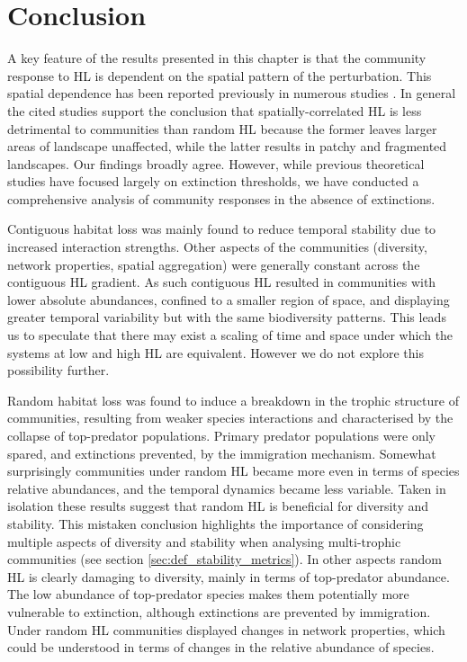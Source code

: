 \clearpage
\section{Conclusion}
\label{sec:hir_discussion}

A key feature of the results presented in this chapter is that the community response to HL is dependent on the spatial pattern of the perturbation. This spatial dependence has been reported previously in numerous studies \cite{jager2006simulated,dytham1995effect,hill1999habitat,travis2003climate,sole2006ecological,with1999extinction,ovaskainen2002metapopulation}.
In general the cited studies support the conclusion that spatially-correlated HL is less detrimental to communities than random HL because the former leaves larger areas of landscape unaffected, while the latter results in patchy and fragmented landscapes. Our findings broadly agree. However, while previous theoretical studies have focused largely on extinction thresholds, we have conducted a comprehensive analysis of community responses in the absence of extinctions. 

Contiguous habitat loss was mainly found to reduce temporal stability due to increased interaction strengths. Other aspects of the communities (diversity, network properties, spatial aggregation) were generally constant across the contiguous HL gradient. As such contiguous HL resulted in communities with lower absolute abundances, confined to a smaller region of space, and displaying greater temporal variability but with the same biodiversity patterns. This leads us to speculate that there may exist a scaling of time and space under which the systems at low and high HL are equivalent. However we do not explore this possibility further. 

Random habitat loss was found to induce a breakdown in the trophic structure of communities, resulting from weaker species interactions and characterised by the collapse of top-predator populations. Primary predator populations were only spared, and extinctions prevented, by the immigration mechanism. Somewhat surprisingly communities under random HL became more even in terms of species relative abundances, and the temporal dynamics became less variable. Taken in isolation these results suggest that random HL is beneficial for diversity and stability. This mistaken conclusion highlights the importance of considering multiple aspects of diversity and stability when analysing multi-trophic communities (see section \ref{sec:def_stability_metrics}). In other aspects random HL is clearly damaging to diversity, mainly in terms of top-predator abundance. The low abundance of top-predator species makes them potentially more vulnerable to extinction, although extinctions are prevented by immigration. Under random HL communities displayed changes in network properties, which could be understood in terms of changes in the relative abundance of species.

